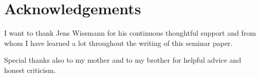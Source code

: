 \chapter*{Acknowledgements}
I want to thank Jens Wissmann for his continuous thoughtful support and
from whom I have learned a lot throughout the writing of this seminar paper.

Special thanks also to my mother and to my brother for helpful advice and honest criticism.
